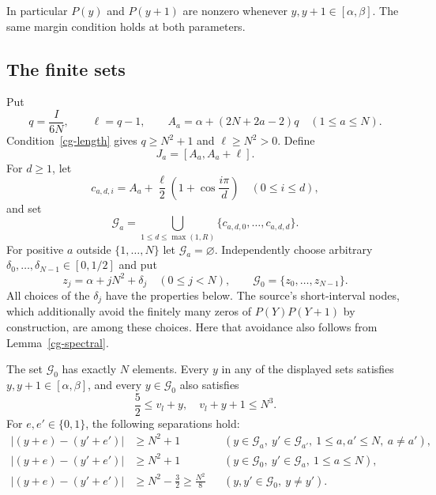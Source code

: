 In particular $P(y)$ and $P(y+1)$ are nonzero whenever
$y,y+1\in[\alpha,\beta]$.  The same margin condition
holds at both parameters.

\subsection{The finite sets}

Put
\[
 q=\frac{I}{6N},\qquad \ell=q-1,\qquad
 A_a=\alpha+(2N+2a-2)q\quad(1\leq a\leq N).
\]
Condition~\eqref{cg-length} gives $q\geq N^2+1$ and
$\ell\geq N^2>0$.  Define
\[
                    J_a=[A_a,A_a+\ell].
\]
For $d\geq1$, let
\[
 c_{a,d,i}
   =A_a+\frac{\ell}{2}
                \left(1+\cos\frac{i\pi}{d}\right)
                       \quad(0\leq i\leq d),
\]
and set
\[
 \mathcal G_a=
       \bigcup_{1\leq d\leq\max(1,R)}
                    \{c_{a,d,0},\ldots,c_{a,d,d}\}.
\]
For positive $a$ outside $\{1,\ldots,N\}$ let
$\mathcal G_a=\varnothing$.
Independently choose arbitrary
$\delta_0,\ldots,\delta_{N-1}\in[0,1/2]$ and put
\[
 z_j=\alpha+jN^2+\delta_j\quad(0\leq j<N),\qquad
 \mathcal G_0=\{z_0,\ldots,z_{N-1}\}.
\]
All choices of the $\delta_j$ have the properties below.
The source's short-interval nodes, which additionally avoid
the finitely many zeros of $P(Y)P(Y+1)$ by construction,
are among these choices.  Here that avoidance also follows
from Lemma~\ref{cg-spectral}.

\begin{proposition}\label{cg-sets}
The set $\mathcal G_0$ has exactly $N$ elements.
Every $y$ in any of the displayed sets satisfies
$y,y+1\in[\alpha,\beta]$, and every $y\in\mathcal G_0$
also satisfies
\[
                 \frac52\leq v_l+y,\quad
                              v_l+y+1\leq N^3.
\]
For $e,e'\in\{0,1\}$, the following separations hold:
\begin{align}
 |(y+e)-(y'+e')|&\geq N^2+1
       &&(y\in\mathcal G_a,\ y'\in\mathcal G_{a'},\
                   1\leq a,a'\leq N,\ a\ne a'),\label{cg-long-sep}\\
 |(y+e)-(y'+e')|&\geq N^2+1
       &&(y\in\mathcal G_0,\ y'\in\mathcal G_a,\
                   1\leq a\leq N),\label{cg-cross-sep}\\
 |(y+e)-(y'+e')|&\geq N^2-\frac32\geq\frac{N^2}{8}
       &&(y,y'\in\mathcal G_0,\ y\ne y').\label{cg-short-sep}
\end{align}
\end{proposition}

